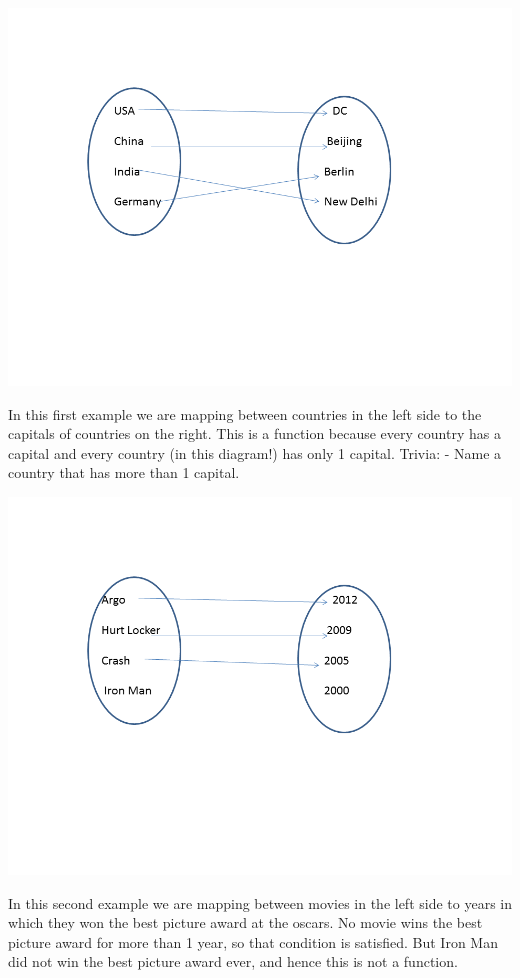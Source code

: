 \documentclass[12pt]{article}
\begin{document}
\includegraphics[scale=0.5]{./img/func1.png}

In this first example we are mapping between countries in the left side to the capitals of countries on the right. This is a function because every country has a capital and every country (in this diagram!) has only 1 capital. Trivia: - Name a country that has more than 1 capital.

\includegraphics[scale=0.5]{./img/func2.png}

In this second example we are mapping between movies in the left side to years in which they won the best picture award at the oscars. No movie wins the best picture award for more than 1 year, so that condition is satisfied. But Iron Man did not win the best picture award ever, and hence this is not a function.
\end{document}

